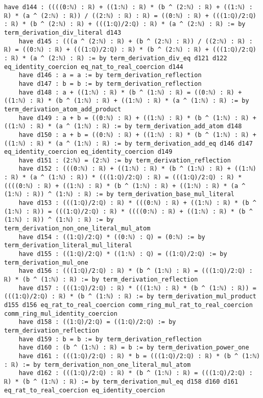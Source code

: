 \documentclass{article}
\begin{document}
\begin{tcolorbox}[colback=white!10, width=\linewidth]
\begin{lstlisting}[language=Lean4]
    have d144 : ((((0:ℕ) : ℝ) + ((1:ℕ) : ℝ) * (b ^ (2:ℕ) : ℝ) + ((1:ℕ) : ℝ) * (a ^ (2:ℕ) : ℝ)) / ((2:ℕ) : ℝ) : ℝ) = ((0:ℕ) : ℝ) + (((1:ℚ)/2:ℚ) : ℝ) * (b ^ (2:ℕ) : ℝ) + (((1:ℚ)/2:ℚ) : ℝ) * (a ^ (2:ℕ) : ℝ) := by term_derivation_div_literal d143
    have d145 : (((a ^ (2:ℕ) : ℝ) + (b ^ (2:ℕ) : ℝ)) / ((2:ℕ) : ℝ) : ℝ) = ((0:ℕ) : ℝ) + (((1:ℚ)/2:ℚ) : ℝ) * (b ^ (2:ℕ) : ℝ) + (((1:ℚ)/2:ℚ) : ℝ) * (a ^ (2:ℕ) : ℝ) := by term_derivation_div_eq d121 d122 eq_identity_coercion eq_nat_to_real_coercion d144
    have d146 : a = a := by term_derivation_reflection
    have d147 : b = b := by term_derivation_reflection
    have d148 : a + ((1:ℕ) : ℝ) * (b ^ (1:ℕ) : ℝ) = ((0:ℕ) : ℝ) + ((1:ℕ) : ℝ) * (b ^ (1:ℕ) : ℝ) + ((1:ℕ) : ℝ) * (a ^ (1:ℕ) : ℝ) := by term_derivation_atom_add_product
    have d149 : a + b = ((0:ℕ) : ℝ) + ((1:ℕ) : ℝ) * (b ^ (1:ℕ) : ℝ) + ((1:ℕ) : ℝ) * (a ^ (1:ℕ) : ℝ) := by term_derivation_add_atom d148
    have d150 : a + b = ((0:ℕ) : ℝ) + ((1:ℕ) : ℝ) * (b ^ (1:ℕ) : ℝ) + ((1:ℕ) : ℝ) * (a ^ (1:ℕ) : ℝ) := by term_derivation_add_eq d146 d147 eq_identity_coercion eq_identity_coercion d149
    have d151 : (2:ℕ) = (2:ℕ) := by term_derivation_reflection
    have d152 : (((0:ℕ) : ℝ) + ((1:ℕ) : ℝ) * (b ^ (1:ℕ) : ℝ) + ((1:ℕ) : ℝ) * (a ^ (1:ℕ) : ℝ)) * (((1:ℚ)/2:ℚ) : ℝ) = (((1:ℚ)/2:ℚ) : ℝ) * ((((0:ℕ) : ℝ) + ((1:ℕ) : ℝ) * (b ^ (1:ℕ) : ℝ) + ((1:ℕ) : ℝ) * (a ^ (1:ℕ) : ℝ)) ^ (1:ℕ) : ℝ) := by term_derivation_base_mul_literal
    have d153 : (((1:ℚ)/2:ℚ) : ℝ) * (((0:ℕ) : ℝ) + ((1:ℕ) : ℝ) * (b ^ (1:ℕ) : ℝ)) = (((1:ℚ)/2:ℚ) : ℝ) * ((((0:ℕ) : ℝ) + ((1:ℕ) : ℝ) * (b ^ (1:ℕ) : ℝ)) ^ (1:ℕ) : ℝ) := by term_derivation_non_one_literal_mul_atom
    have d154 : ((1:ℚ)/2:ℚ) * ((0:ℕ) : ℚ) = (0:ℕ) := by term_derivation_literal_mul_literal
    have d155 : ((1:ℚ)/2:ℚ) * ((1:ℕ) : ℚ) = ((1:ℚ)/2:ℚ) := by term_derivation_mul_one
    have d156 : (((1:ℚ)/2:ℚ) : ℝ) * (b ^ (1:ℕ) : ℝ) = (((1:ℚ)/2:ℚ) : ℝ) * (b ^ (1:ℕ) : ℝ) := by term_derivation_reflection
    have d157 : (((1:ℚ)/2:ℚ) : ℝ) * (((1:ℕ) : ℝ) * (b ^ (1:ℕ) : ℝ)) = (((1:ℚ)/2:ℚ) : ℝ) * (b ^ (1:ℕ) : ℝ) := by term_derivation_mul_product d155 d156 eq_rat_to_real_coercion comm_ring_mul_rat_to_real_coercion comm_ring_mul_identity_coercion
    have d158 : ((1:ℚ)/2:ℚ) = ((1:ℚ)/2:ℚ) := by term_derivation_reflection
    have d159 : b = b := by term_derivation_reflection
    have d160 : (b ^ (1:ℕ) : ℝ) = b := by term_derivation_power_one
    have d161 : (((1:ℚ)/2:ℚ) : ℝ) * b = (((1:ℚ)/2:ℚ) : ℝ) * (b ^ (1:ℕ) : ℝ) := by term_derivation_non_one_literal_mul_atom
    have d162 : (((1:ℚ)/2:ℚ) : ℝ) * (b ^ (1:ℕ) : ℝ) = (((1:ℚ)/2:ℚ) : ℝ) * (b ^ (1:ℕ) : ℝ) := by term_derivation_mul_eq d158 d160 d161 eq_rat_to_real_coercion eq_identity_coercion

\end{lstlisting}
\end{tcolorbox}
\end{document}
